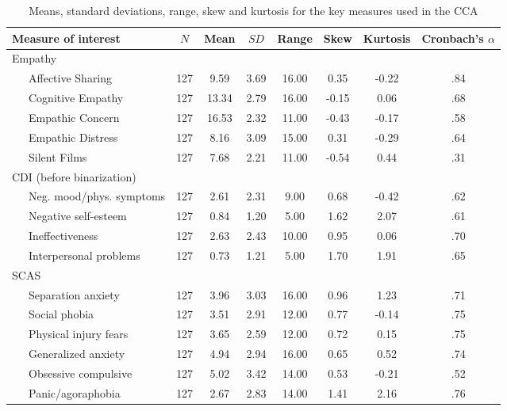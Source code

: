 \documentclass[
  english,
  man,floatsintext]{apa6}
\begin{document}
\begin{table}[tbp]

\begin{center}
\begin{threeparttable}

\caption{\label{tab:meanstable}Means, standard deviations, range, skew and kurtosis for the key measures 
  used in the CCA}

\small{

\begin{tabular}{lccccccc}
\toprule
Measure of interest & $N$ & Mean & $SD$ & Range & Skew & Kurtosis & Cronbach’s $\alpha$\\
\midrule
Empathy &  &  &  &  &  &  & \\
\ \ \ Affective Sharing & 127 & 9.59 & 3.69 & 16.00 & 0.35 & -0.22 & .84\\
\ \ \ Cognitive Empathy & 127 & 13.34 & 2.79 & 16.00 & -0.15 & 0.06 & .68\\
\ \ \ Empathic Concern & 127 & 16.53 & 2.32 & 11.00 & -0.43 & -0.17 & .58\\
\ \ \ Empathic Distress & 127 & 8.16 & 3.09 & 15.00 & 0.31 & -0.29 & .64\\
\ \ \ Silent Films & 127 & 7.68 & 2.21 & 11.00 & -0.54 & 0.44 & .31\\
CDI (before binarization) &  &  &  &  &  &  & \\
\ \ \ Neg. mood/phys. symptoms & 127 & 2.61 & 2.31 & 9.00 & 0.68 & -0.42 & .62\\
\ \ \ Negative self-esteem & 127 & 0.84 & 1.20 & 5.00 & 1.62 & 2.07 & .61\\
\ \ \ Ineffectiveness & 127 & 2.63 & 2.43 & 10.00 & 0.95 & 0.06 & .70\\
\ \ \ Interpersonal problems & 127 & 0.73 & 1.21 & 5.00 & 1.70 & 1.91 & .65\\
SCAS &  &  &  &  &  &  & \\
\ \ \ Separation anxiety & 127 & 3.96 & 3.03 & 16.00 & 0.96 & 1.23 & .71\\
\ \ \ Social phobia & 127 & 3.51 & 2.91 & 12.00 & 0.77 & -0.14 & .75\\
\ \ \ Physical injury fears & 127 & 3.65 & 2.59 & 12.00 & 0.72 & 0.15 & .75\\
\ \ \ Generalized anxiety & 127 & 4.94 & 2.94 & 16.00 & 0.65 & 0.52 & .74\\
\ \ \ Obsessive compulsive & 127 & 5.02 & 3.42 & 14.00 & 0.53 & -0.21 & .52\\
\ \ \ Panic/agoraphobia & 127 & 2.67 & 2.83 & 14.00 & 1.41 & 2.16 & .76\\
\bottomrule
\end{tabular}

}

\end{threeparttable}
\end{center}

\end{table}
\end{document}
